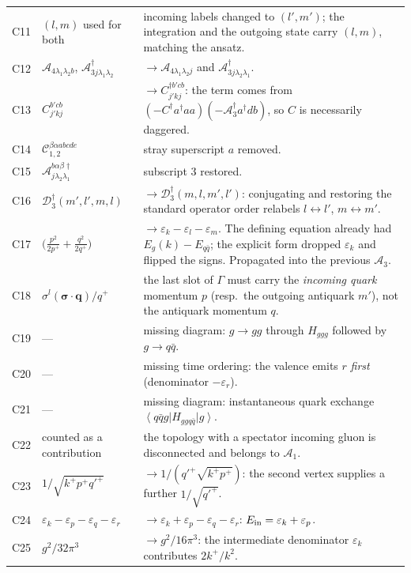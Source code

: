 \documentclass[11pt]{article}
\newcommand{\eps}{\varepsilon}
\newcommand{\dg}{\dagger}
\newcommand{\ket}[1]{\left|#1\right\rangle}
\newcommand{\bra}[1]{\left\langle#1\right|}
\newcommand{\Gam}{\Gamma}
\newcommand{\A}{\mathcal{A}}
\newcommand{\C}{\mathcal{C}}
\newcommand{\D}{\mathcal{D}}
\begin{document}
\begin{center}
\begin{longtable}{c>{\raggedright\arraybackslash}p{3.9cm}p{7.6cm}}
C11 & $(l,m)$ used for both & incoming labels changed to $(l',m')$; the integration and the
outgoing state carry $(l,m)$, matching the ansatz.\\
C12 & $\A_{4\lambda_{1}\lambda_{2}b}$, $\A^{\dg}_{3j\lambda_{1}\lambda_{2}}$ &
$\to\A_{4\lambda_{1}\lambda_{2}j}$ and $\A^{\dg}_{3j\lambda_{2}\lambda_{1}}$.\\
C13 & $C^{b'cb}_{j'kj}$ & $\to C^{\dg b'cb}_{j'kj}$: the term comes from
$(-C^{\dg}a^{\dg}aa)(-\A^{\dg}_{3}a^{\dg}db)$, so $C$ is necessarily daggered.\\
C14 & $\C_{1,2}^{\beta\alpha abcde}$ & stray superscript $a$ removed.\\
C15 & $\A^{b\alpha\beta\dg}_{j\lambda_{2}\lambda_{1}}$ & subscript $3$ restored.\\
C16 & $\D^{\dg}_{3}(m',l',m,l)$ & $\to\D^{\dg}_{3}(m,l,m',l')$: conjugating and restoring the
standard operator order relabels $l\leftrightarrow l'$, $m\leftrightarrow m'$.\\
C17 & $\big(\tfrac{p^{2}}{2p^{+}}+\tfrac{q^{2}}{2q^{+}}\big)$ &
$\to\eps_{k}-\eps_{l}-\eps_{m}$. The defining equation already had
$E_{g}(k)-E_{q\bar q}$; the explicit form dropped $\eps_{k}$ and flipped the signs. Propagated
into the previous $\A_{3}$.\\
C18 & $\sigma^{l}(\bm\sigma\!\cdot\!\bm q)/q^{+}$ & the last slot of $\Gam$ must carry the
\emph{incoming quark} momentum $p$ (resp.\ the outgoing antiquark $m'$), not the antiquark
momentum $q$.\\
C19 & --- & missing diagram: $g\to gg$ through $H_{ggg}$ followed by $g\to q\bar q$.\\
C20 & --- & missing time ordering: the valence emits $r$ \emph{first} (denominator $-\eps_{r}$).\\
C21 & --- & missing diagram: instantaneous quark exchange $\bra{q\bar q g}H_{ggq\bar q}\ket{g}$.\\
C22 & counted as a contribution & the topology with a spectator incoming gluon is disconnected and
belongs to $\A_{1}$.\\
C23 & $1/\sqrt{k^{+}p^{+}q'^{+}}$ & $\to 1/(q'^{+}\sqrt{k^{+}p^{+}})$: the second vertex supplies
a further $1/\sqrt{q'^{+}}$.\\
C24 & $\eps_{k}-\eps_{p}-\eps_{q}-\eps_{r}$ & $\to\eps_{k}+\eps_{p}-\eps_{q}-\eps_{r}$:
$E_{\rm in}=\eps_{k}+\eps_{p}$.\\
C25 & $g^{2}/32\pi^{3}$ & $\to g^{2}/16\pi^{3}$: the intermediate denominator $\eps_{k}$
contributes $2k^{+}/k^{2}$.\\

\end{longtable}
\end{center}
\end{document}
